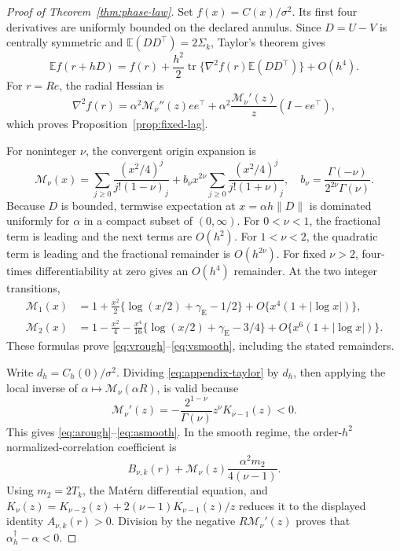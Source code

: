 \documentclass[sigconf]{acmart}
\theoremstyle{remark}
\newcommand{\Matern}{\mathcal M}
\newcommand{\E}{\mathbb E}
\newcommand{\tr}{\operatorname{tr}}
\begin{document}
\begin{proof}[Proof of Theorem~\ref{thm:phase-law}]
Set \(f(x)=C(x)/\sigma^2\). Its first four
derivatives are uniformly bounded on the declared annulus.  Since
\(D=U-V\) is centrally symmetric and
\(\E(DD^\top)=2\Sigma_k\), Taylor's theorem gives
\begin{equation}
 \E f(r+hD)
 =f(r)+\frac{h^2}{2}
  \tr\{\nabla^2f(r)\E(DD^\top)\}+O(h^4).
 \label{eq:appendix-taylor}
\end{equation}
For \(r=Re\), the radial Hessian is
\[
 \nabla^2f(r)=\alpha^2\Matern_\nu''(z)ee^\top
 +\alpha^2\frac{\Matern_\nu'(z)}z(I-ee^\top),
\]
which proves Proposition~\ref{prop:fixed-lag}.

For noninteger \(\nu\), the convergent origin expansion is
\begin{equation}
\Matern_\nu(x)=
\sum_{j\geq0}\frac{(x^2/4)^j}{j!(1-\nu)_j}
+b_\nu x^{2\nu}\sum_{j\geq0}\frac{(x^2/4)^j}{j!(1+\nu)_j},
\quad b_\nu=\frac{\Gamma(-\nu)}{2^{2\nu}\Gamma(\nu)}.
\label{eq:appendix-bessel}
\end{equation}
Because \(D\) is bounded, termwise expectation at
\(x=\alpha h\lVert D\rVert\) is dominated uniformly for \(\alpha\) in a
compact subset of \((0,\infty)\).  For \(0<\nu<1\), the fractional term is
leading and the next terms are \(O(h^2)\).  For \(1<\nu<2\), the quadratic
term is leading and the fractional remainder is \(O(h^{2\nu})\).  For fixed
\(\nu>2\), four-times differentiability at zero gives an \(O(h^4)\)
remainder.  At the two integer transitions,
\begin{align}
 \Matern_1(x)
 &=1+\frac{x^2}{2}\{\log(x/2)+\gamma_{\mathrm E}-1/2\}
   +O\{x^4(1+|\log x|)\},\\
 \Matern_2(x)
 &=1-\frac{x^2}{4}
   -\frac{x^4}{16}\{\log(x/2)+\gamma_{\mathrm E}-3/4\}
   +O\{x^6(1+|\log x|)\}.
\end{align}
These formulas prove \eqref{eq:vrough}--\eqref{eq:vsmooth}, including the
stated remainders.

Write \(d_h=C_h(0)/\sigma^2\).  Dividing
\eqref{eq:appendix-taylor} by \(d_h\), then applying the local inverse of
\(\alpha\mapsto\Matern_\nu(\alpha R)\), is valid because
\[
\Matern_\nu'(z)
=-\frac{2^{1-\nu}}{\Gamma(\nu)}z^\nu K_{\nu-1}(z)<0.
\]
This gives \eqref{eq:arough}--\eqref{eq:asmooth}.  In the smooth regime, the
order-\(h^2\)
normalized-correlation coefficient is
\[
 B_{\nu,k}(r)+\Matern_\nu(z)\frac{\alpha^2m_2}{4(\nu-1)}.
\]
Using \(m_2=2T_k\), the Matérn differential equation, and
\(
K_\nu(z)=K_{\nu-2}(z)+2(\nu-1)K_{\nu-1}(z)/z
\)
reduces it to the displayed identity \(A_{\nu,k}(r)>0\).  Division by the
negative
\(R\Matern_\nu'(z)\) proves that \(\alpha_h^\dagger-\alpha<0\).
\end{proof}
\end{document}
